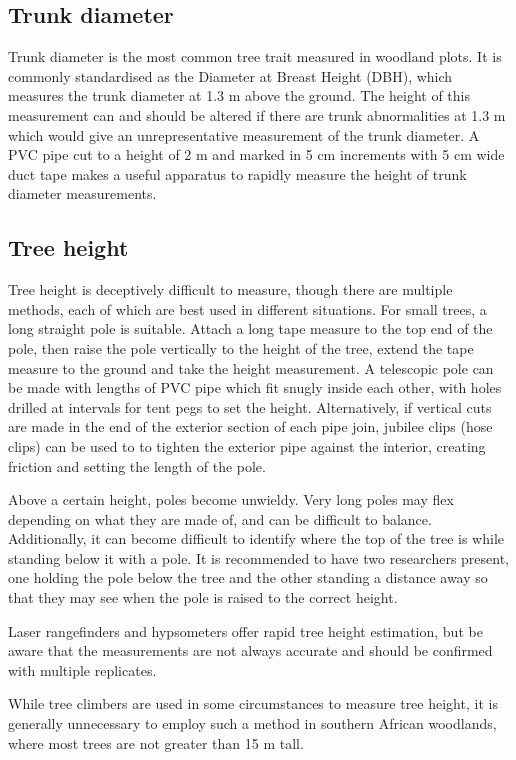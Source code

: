 \documentclass[11pt,a4paper]{article}
\begin{document}
\subsection{Trunk diameter}

Trunk diameter is the most common tree trait measured in woodland plots. It is commonly standardised as the Diameter at Breast Height (DBH), which measures the trunk diameter at 1.3 m above the ground. The height of this measurement can and should be altered if there are trunk abnormalities at 1.3 m which would give an unrepresentative measurement of the trunk diameter. A PVC pipe cut to a height of 2 m and marked in 5 cm increments with 5 cm wide duct tape makes a useful apparatus to rapidly measure the height of trunk diameter measurements.

\subsection{Tree height}

Tree height is deceptively difficult to measure, though there are multiple methods, each of which are best used in different situations. For small trees, a long straight pole is suitable. Attach a long tape measure to the top end of the pole, then raise the pole vertically to the height of the tree, extend the tape measure to the ground and take the height measurement. A telescopic pole can be made with lengths of PVC pipe which fit snugly inside each other, with holes drilled at intervals for tent pegs to set the height. Alternatively, if vertical cuts are made in the end of the exterior section of each pipe join, jubilee clips (hose clips) can be used to to tighten the exterior pipe against the interior, creating friction and setting the length of the pole.

Above a certain height, poles become unwieldy. Very long poles may flex depending on what they are made of, and can be difficult to balance. Additionally, it can become difficult to identify where the top of the tree is while standing below it with a pole. It is recommended to have two researchers present, one holding the pole below the tree and the other standing a distance away so that they may see when the pole is raised to the correct height.  

Laser rangefinders and hypsometers offer rapid tree height estimation, but be aware that the measurements are not always accurate and should be confirmed with multiple replicates.

While tree climbers are used in some circumstances to measure tree height, it is generally unnecessary to employ such a method in southern African woodlands, where most trees are not greater than 15 m tall.
\end{document}
